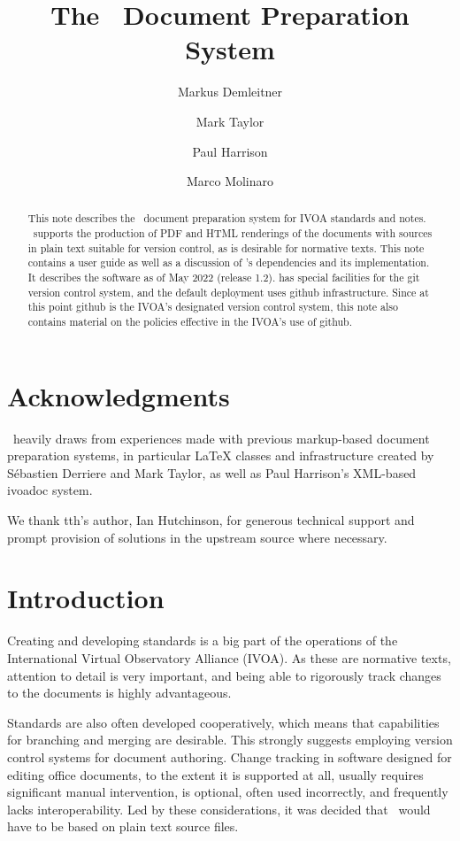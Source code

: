 \documentclass[11pt,a4paper]{ivoa}
\title{The \ivoatex\ Document Preparation System}
\author[http://www.ivoa.net/cgi-bin/twiki/bin/view/IVOA/MarkusDemleitner]{Markus Demleitner}
\author[http://www.ivoa.net/cgi-bin/twiki/bin/view/IVOA/MarkTaylor]{Mark Taylor}
\author[http://www.ivoa.net/cgi-bin/twiki/bin/view/IVOA/PaulHarrison]{Paul Harrison}
\author[http://www.ivoa.net/cgi-bin/twiki/bin/view/IVOA/MarcoMolinaro]{Marco Molinaro}
\begin{document}
\begin{abstract}
This note describes the \ivoatex\ document preparation system for IVOA
standards and notes.  \ivoatex\ supports the production of
PDF and HTML renderings of the documents with sources in
plain text suitable for version control, as is desirable for normative
texts.  This note contains a user guide as well as a discussion of 
\ivoatex's dependencies and its implementation.  It describes the
software as of May 2022 (release 1.2).
\ivoatex{} has special facilities for the git version control system,
and the default deployment uses github infrastructure.  Since at this
point github is the IVOA's designated version control system, this note
also contains material on the policies effective in the IVOA's use of
github.

\end{abstract}


\section*{Acknowledgments}

\ivoatex\ heavily draws from experiences made with previous markup-based
document preparation systems, in particular LaTeX classes and
infrastructure created by S\'ebastien Derriere and Mark Taylor, as well
as Paul Harrison's XML-based ivoadoc system.

We thank tth's author, Ian Hutchinson, for generous technical support
and prompt provision of solutions in the upstream source where necessary.

\section{Introduction}

Creating and developing standards is a  big part of the operations of
the International Virtual Observatory Alliance (IVOA).
As these are normative texts, attention to detail is very important, and
being able to rigorously track changes to the documents is highly
advantageous.  

Standards are also often developed cooperatively, which means that
capabilities for branching and merging are desirable.  This strongly
suggests employing version control systems for document authoring.
Change tracking in software designed for editing office documents, to
the extent it is supported at all, usually requires significant
manual intervention, is optional, often used incorrectly, and frequently
lacks interoperability.  Led by these considerations, it was decided that
\ivoatex\ would have to be based on plain text source files.
\end{document}
